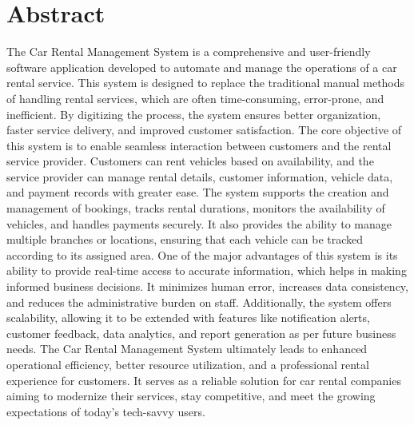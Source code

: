 \documentclass[12pt,a4paper]{report}
\begin{document}
\newpage
\pagestyle{plain}
\chapter*{Abstract}
The Car Rental Management System is a comprehensive and user-friendly software application developed to automate and manage the operations of a car rental service. This system is designed to replace the traditional manual methods of handling rental services, which are often time-consuming, error-prone, and inefficient. By digitizing the process, the system ensures better organization, faster service delivery, and improved customer satisfaction. The core objective of this system is to enable seamless interaction between customers and the rental service provider. Customers can rent vehicles based on availability, and the service provider can manage rental details, customer information, vehicle data, and payment records with greater ease. The system supports the creation and management of bookings, tracks rental durations, monitors the availability of vehicles, and handles payments securely. It also provides the ability to manage multiple branches or locations, ensuring that each vehicle can be tracked according to its assigned area. One of the major advantages of this system is its ability to provide real-time access to accurate information, which helps in making informed business decisions. It minimizes human error, increases data consistency, and reduces the administrative burden on staff. Additionally, the system offers scalability, allowing it to be extended with features like notification alerts, customer feedback, data analytics, and report generation as per future business needs. The Car Rental Management System ultimately leads to enhanced operational efficiency, better resource utilization, and a professional rental experience for customers. It serves as a reliable solution for car rental companies aiming to modernize their services, stay competitive, and meet the growing expectations of today’s tech-savvy users.
\end{document}
